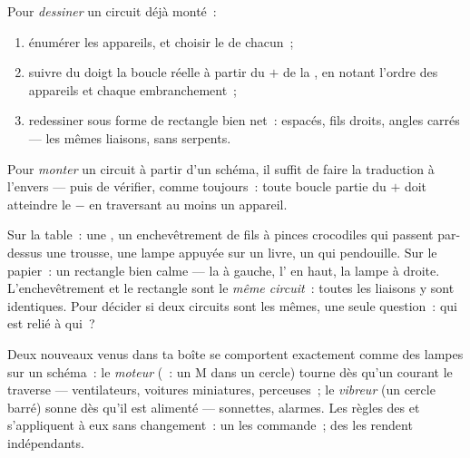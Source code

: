 \begin{method}\label{met:g6:circuits-and-safety:translate}
Pour \emph{dessiner} un circuit déjà monté~:
\begin{enumerate}
  \item énumérer les appareils, et choisir le  de chacun~;
  \item suivre du doigt la boucle réelle à partir du $+$ de la
        , en notant l'ordre des appareils et chaque
        embranchement~;
  \item redessiner sous forme de rectangle bien net~: 
        espacés, fils droits, angles carrés --- les mêmes liaisons,
        sans serpents.
\end{enumerate}
Pour \emph{monter} un circuit à partir d'un schéma, il suffit de
faire la traduction à l'envers --- puis de vérifier, comme
toujours~: toute boucle partie du $+$ doit atteindre le $-$ en
traversant au moins un appareil.
\end{method}

\begin{example}\label{ex:g6:circuits-and-safety:portraits}
Sur la table~: une , un enchevêtrement de fils à pinces
crocodiles qui passent par-dessus une trousse, une lampe appuyée sur
un livre, un  qui pendouille. Sur le papier~: un
rectangle bien calme --- la  à gauche, l' en haut, la
lampe à droite. L'enchevêtrement et le rectangle sont le \emph{même
circuit}~: toutes les liaisons y sont identiques. Pour décider si
deux circuits sont les mêmes, une seule question~: qui est relié à
qui~?
\end{example}

\begin{example}\label{ex:g6:circuits-and-safety:motor}
Deux nouveaux venus dans ta boîte se comportent exactement comme des
lampes sur un schéma~: le \emph{moteur} (~: un M
dans un cercle) tourne dès qu'un courant le traverse --- ventilateurs,
voitures miniatures, perceuses~; le \emph{vibreur}
(un cercle barré) sonne dès qu'il est alimenté --- sonnettes,
alarmes. Les règles des  et 
s'appliquent à eux sans changement~: un   les
commande~; des   les rendent indépendants.
\end{example}


